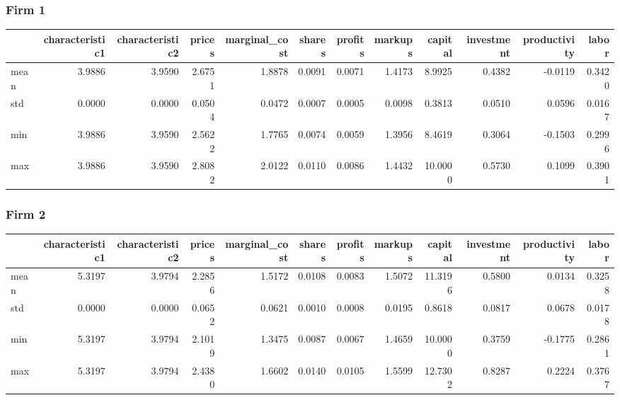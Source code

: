  \subsubsection*{Firm 1}
\begin{tabular}{lrrrrrrrrrrr}
\toprule
{} &  characteristic1 &  characteristic2 &  prices &  marginal\_cost &  shares &  profits &  markups &  capital &  investment &  productivity &  labor \\
\midrule
mean &           3.9886 &           3.9590 &  2.6751 &         1.8878 &  0.0091 &   0.0071 &   1.4173 &   8.9925 &      0.4382 &       -0.0119 & 0.3420 \\
std  &           0.0000 &           0.0000 &  0.0504 &         0.0472 &  0.0007 &   0.0005 &   0.0098 &   0.3813 &      0.0510 &        0.0596 & 0.0167 \\
min  &           3.9886 &           3.9590 &  2.5622 &         1.7765 &  0.0074 &   0.0059 &   1.3956 &   8.4619 &      0.3064 &       -0.1503 & 0.2996 \\
max  &           3.9886 &           3.9590 &  2.8082 &         2.0122 &  0.0110 &   0.0086 &   1.4432 &  10.0000 &      0.5730 &        0.1099 & 0.3901 \\
\bottomrule
\end{tabular}


 \subsubsection*{Firm 2}
\begin{tabular}{lrrrrrrrrrrr}
\toprule
{} &  characteristic1 &  characteristic2 &  prices &  marginal\_cost &  shares &  profits &  markups &  capital &  investment &  productivity &  labor \\
\midrule
mean &           5.3197 &           3.9794 &  2.2856 &         1.5172 &  0.0108 &   0.0083 &   1.5072 &  11.3196 &      0.5800 &        0.0134 & 0.3258 \\
std  &           0.0000 &           0.0000 &  0.0652 &         0.0621 &  0.0010 &   0.0008 &   0.0195 &   0.8618 &      0.0817 &        0.0678 & 0.0178 \\
min  &           5.3197 &           3.9794 &  2.1019 &         1.3475 &  0.0087 &   0.0067 &   1.4659 &  10.0000 &      0.3759 &       -0.1775 & 0.2861 \\
max  &           5.3197 &           3.9794 &  2.4380 &         1.6602 &  0.0140 &   0.0105 &   1.5599 &  12.7302 &      0.8287 &        0.2224 & 0.3767 \\
\bottomrule
\end{tabular}


